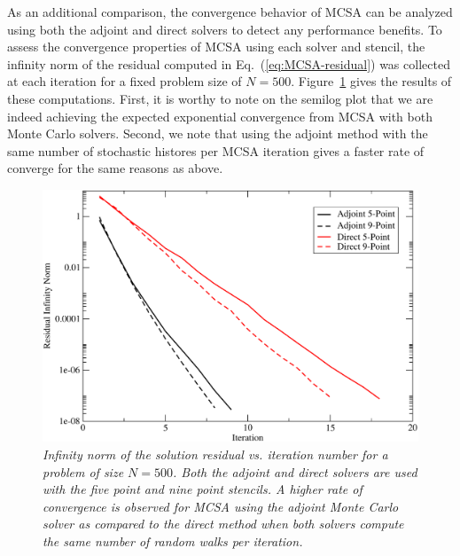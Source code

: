 \documentclass[preprint,12pt]{elsarticle}
\begin{document}
As an additional comparison, the convergence behavior of MCSA can be
analyzed using both the adjoint and direct solvers to detect any
performance benefits. To assess the convergence properties of MCSA
using each solver and stencil, the infinity norm of the residual
computed in Eq.~(\ref{eq:MCSA-residual}) was collected at each
iteration for a fixed problem size of
$N=500$. Figure~\ref{fig:poisson_convergence} gives the results of
these computations. First, it is worthy to note on the semilog plot
that we are indeed achieving the expected exponential convergence from
MCSA with both Monte Carlo solvers. Second, we note that using the
adjoint method with the same number of stochastic histores per MCSA
iteration gives a faster rate of converge for the same reasons as
above.
\begin{figure}[ht!]
  \centering
  \includegraphics[width=5in,clip]{dir_adj_conv.pdf}
  \caption{\sl Infinity norm of the solution residual vs. iteration
    number for a problem of size $N=500$. Both the adjoint and direct
    solvers are used with the five point and nine point stencils. A
    higher rate of convergence is observed for MCSA using the adjoint
    Monte Carlo solver as compared to the direct method when both
    solvers compute the same number of random walks per iteration.}
  \label{fig:poisson_convergence}
\end{figure}
\end{document}
